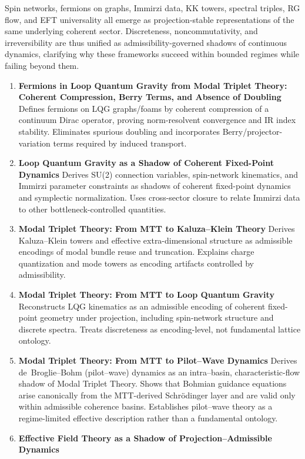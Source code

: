 \documentclass[11pt]{article}
\begin{document}
Spin networks, fermions on graphs, Immirzi data, KK towers, spectral triples, RG flow,
and EFT universality all emerge as projection-stable representations of the same
underlying coherent sector. Discreteness, noncommutativity, and irreversibility are thus
unified as admissibility-governed shadows of continuous dynamics, clarifying why these
frameworks succeed within bounded regimes while failing beyond them.

\begin{enumerate}[leftmargin=*]
\item \textbf{Fermions in Loop Quantum Gravity from Modal Triplet Theory: Coherent Compression, Berry Terms, and Absence of Doubling} Defines fermions on LQG graphs/foams by coherent compression of a continuum Dirac operator, proving norm-resolvent convergence and IR index stability. Eliminates spurious doubling and incorporates Berry/projector-variation terms required by induced transport.
\item \textbf{Loop Quantum Gravity as a Shadow of Coherent Fixed-Point Dynamics} Derives SU(2) connection variables, spin-network kinematics, and Immirzi parameter constraints as shadows of coherent fixed-point dynamics and symplectic normalization. Uses cross-sector closure to relate Immirzi data to other bottleneck-controlled quantities.
\item \textbf{Modal Triplet Theory: From MTT to Kaluza–Klein Theory} Derives Kaluza–Klein towers and effective extra-dimensional structure as admissible encodings of modal bundle reuse and truncation. Explains charge quantization and mode towers as encoding artifacts controlled by admissibility.
\item \textbf{Modal Triplet Theory: From MTT to Loop Quantum Gravity} Reconstructs LQG kinematics as an admissible encoding of coherent fixed-point geometry under projection, including spin-network structure and discrete spectra. Treats discreteness as encoding-level, not fundamental lattice ontology.
\item \textbf{Modal Triplet Theory: From MTT to Pilot--Wave Dynamics} 
Derives de~Broglie--Bohm (pilot--wave) dynamics as an intra--basin, characteristic-flow shadow of Modal Triplet Theory. Shows that Bohmian guidance equations arise canonically from the MTT-derived Schrödinger layer and are valid only within admissible coherence basins. Establishes pilot--wave theory as a regime-limited effective description rather than a fundamental ontology.
\item \textbf{Effective Field Theory as a Shadow of Projection–Admissible Dynamics} 

\end{enumerate}
\end{document}
